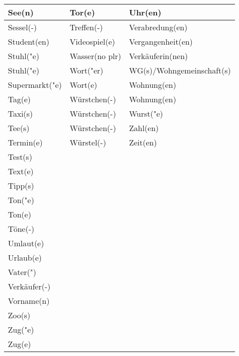 \documentclass{article}
\begin{document}
\begin{table}[h!]
\begin{tabular}{|>{\raggedright\arraybackslash}p{5cm}|>{\raggedright\arraybackslash}p{5cm}|>{\raggedright\arraybackslash}p{5cm}|}
        See(n) & Tor(e) & Uhr(en) \\\hline
        Sessel(-) & Treffen(-) & Verabredung(en) \\\hline
        Student(en) & Videospiel(e) & Vergangenheit(en) \\\hline
        Stuhl("e) & Wasser(no plr) & Verkäuferin(nen) \\\hline
        Stuhl("e) & Wort("er) & WG(s)/Wohngemeinschaft(s) \\\hline
        Supermarkt("e) & Wort(e) & Wohnung(en) \\\hline
        Tag(e) & Würstchen(-) & Wohnung(en) \\\hline
        Taxi(s) & Würstchen(-) & Wurst("e) \\\hline
        Tee(s) & Würstchen(-) & Zahl(en) \\\hline
        Termin(e) & Würstel(-) & Zeit(en) \\\hline
        Test(s) &  &  \\\hline
        Text(e) &  &  \\\hline
        Tipp(s) &  &  \\\hline
        Ton("e) &  &  \\\hline
        Ton(e) &  &  \\\hline
        Töne(-) &  &  \\\hline
        Umlaut(e) &  &  \\\hline
        Urlaub(e) &  &  \\\hline
        Vater(") &  &  \\\hline
        Verkäufer(-) &  &  \\\hline
        Vorname(n) &  &  \\\hline
        Zoo(s) &  &  \\\hline
        Zug("e) &  &  \\\hline
        Zug(e) &  &  \\\hline
    \end{tabular}
\end{table}
\end{document}
